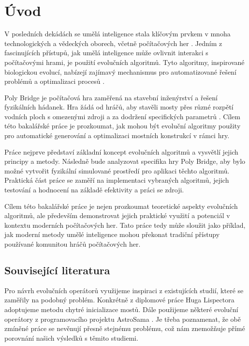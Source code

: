 \chapter*{Úvod}

V posledních dekádách se umělá inteligence stala klíčovým prvkem v mnoha technologických a vědeckých oborech, včetně počítačových her \cite{CAMPBELL200257} \cite{Vinyals2019}. Jedním z fascinujících přístupů, jak umělá inteligence může ovlivnit interakci s počítačovými hrami, je použití evolučních algoritmů. Tyto algoritmy, inspirované biologickou evolucí, nabízejí zajímavý mechanismus pro automatizované řešení problémů a optimalizaci procesů \cite{EibenSmith2015}.

Poly Bridge je počítačová hra zaměřená na stavební inženýrství a řešení fyzikálních hádanek. Hra žádá od hráčů, aby stavěli mosty přes různé rozpětí vodních ploch s omezenými zdroji a za dodržení specifických parametrů \cite{drycactus}. Cílem této bakalářské práce je prozkoumat, jak mohou být evoluční algoritmy použity pro automatické generování a optimalizaci mostních konstrukcí v rámci hry.

Práce nejprve představí základní koncept evolučních algoritmů a vysvětlí jejich principy a metody. Následně bude analyzovat specifika hry Poly Bridge, aby bylo možné vytvořit fyzikální simulované prostředí pro aplikaci těchto algoritmů. Praktická část práce se zaměří na implementaci vybraných algoritmů, jejich testování a hodnocení na základě efektivity a práci se zdroji.

Cílem této bakalářské práce je nejen prozkoumat teoretické aspekty evolučních algoritmů, ale především demonstrovat jejich praktické využití a potenciál v kontextu moderních počítačových her. Tato práce tedy může sloužit jako příklad, jak moderní metody umělé inteligence mohou překonat tradiční přístupy používané komunitou hráčů počítačových her. 

\section{Související literatura}

Pro návrh evolučních operátorů využijeme inspiraci z existujících studií, které se zaměřily na podobný problém. Konkrétně z diplomové práce Huga Lispectora \cite{Lispector2022} adoptujeme metodu chytré inicializace mostů. Dále použijeme některé evoluční operátory z programovacího projektu AstroSama \cite{AstroSam2023}. Je třeba poznamenat, že obě zmíněné práce se nevěnují přesně stejnému problému, což nám znemožňuje přímé porovnání našich výsledků s těmito studiemi.
